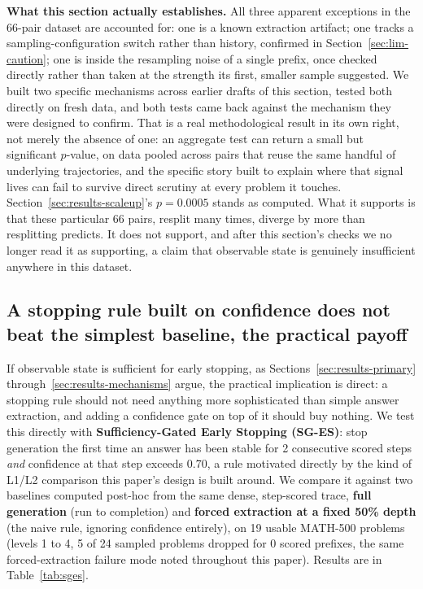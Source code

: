 \documentclass{article}
\begin{document}
\textbf{What this section actually establishes.} All three apparent exceptions in the 66-pair dataset are accounted for: one is a known extraction artifact; one tracks a sampling-configuration switch rather than history, confirmed in Section~\ref{sec:lim-caution}; one is inside the resampling noise of a single prefix, once checked directly rather than taken at the strength its first, smaller sample suggested. We built two specific mechanisms across earlier drafts of this section, tested both directly on fresh data, and both tests came back against the mechanism they were designed to confirm. That is a real methodological result in its own right, not merely the absence of one: an aggregate test can return a small but significant $p$-value, on data pooled across pairs that reuse the same handful of underlying trajectories, and the specific story built to explain where that signal lives can fail to survive direct scrutiny at every problem it touches. Section~\ref{sec:results-scaleup}'s $p=0.0005$ stands as computed. What it supports is that these particular 66 pairs, resplit many times, diverge by more than resplitting predicts. It does not support, and after this section's checks we no longer read it as supporting, a claim that observable state is genuinely insufficient anywhere in this dataset.

\subsection{A stopping rule built on confidence does not beat the simplest baseline, the practical payoff}
\label{sec:results-sges}

If observable state is sufficient for early stopping, as Sections~\ref{sec:results-primary} through~\ref{sec:results-mechanisms} argue, the practical implication is direct: a stopping rule should not need anything more sophisticated than simple answer extraction, and adding a confidence gate on top of it should buy nothing. We test this directly with \textbf{Sufficiency-Gated Early Stopping (SG-ES)}: stop generation the first time an answer has been stable for 2 consecutive scored steps \emph{and} confidence at that step exceeds 0.70, a rule motivated directly by the kind of L1/L2 comparison this paper's design is built around. We compare it against two baselines computed post-hoc from the same dense, step-scored trace, \textbf{full generation} (run to completion) and \textbf{forced extraction at a fixed 50\% depth} (the naive rule, ignoring confidence entirely), on 19 usable MATH-500 problems (levels 1 to 4, 5 of 24 sampled problems dropped for 0 scored prefixes, the same forced-extraction failure mode noted throughout this paper). Results are in Table~\ref{tab:sges}.
\end{document}
